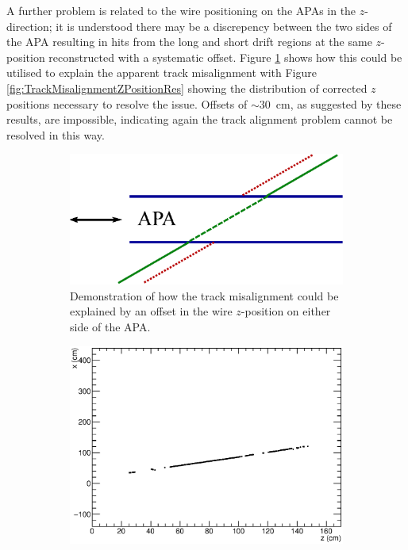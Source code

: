 A further problem is related to the wire positioning on the APAs in the $z$-direction; it is understood there may be a discrepency between the two sides of the APA resulting in hits from the long and short drift regions at the same $z$-position reconstructed with a systematic offset.  Figure \ref{fig:TrackMisalignmentZPositionGeo} shows how this could be utilised to explain the apparent track misalignment with Figure \ref{fig:TrackMisalignmentZPositionRes} showing the distribution of corrected $z$ positions necessary to resolve the issue.  Offsets of $\sim30$~cm, as suggested by these results, are impossible, indicating again the track alignment problem cannot be resolved in this way.

\begin{figure}
  \centering
  \begin{subfigure}[t]{0.48\linewidth}
    \centering
    \includegraphics[width=\textwidth]{misalign_track_wire_geo.eps}
    \caption{Demonstration of how the track misalignment could be explained by an offset in the wire $z$-position on either side of the APA.}
    \label{fig:TrackMisalignmentZPositionGeo}
  \end{subfigure}
  \hfill
  \begin{subfigure}[t]{0.48\linewidth}
    \centering
    \includegraphics[width=\textwidth]{misalign_track_wire_res.eps}

\end{subfigure}
\end{figure}
